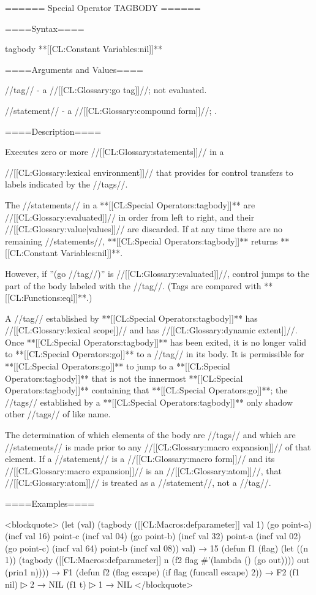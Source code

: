====== Special Operator TAGBODY ======

====Syntax====

\DefspecWithValues tagbody {} {**[[CL:Constant Variables:nil]]**}

====Arguments and Values====

//tag// - a //[[CL:Glossary:go tag]]//; not evaluated.

//statement// - a //[[CL:Glossary:compound form]]//; \evalspecial.

====Description====

Executes zero or more //[[CL:Glossary:statements]]// in a

//[[CL:Glossary:lexical environment]]// that provides for control transfers to labels indicated by the //tags//.

The //statements// in a **[[CL:Special Operators:tagbody]]** are //[[CL:Glossary:evaluated]]// in order from left to right, and their //[[CL:Glossary:value|values]]// are discarded. If at any time there are no remaining //statements//, **[[CL:Special Operators:tagbody]]** returns **[[CL:Constant Variables:nil]]**.

However, if ''(go //tag//)'' is //[[CL:Glossary:evaluated]]//, control jumps to the part of the body labeled with the //tag//. (Tags are compared with **[[CL:Functions:eql]]**.)

A //tag// established by **[[CL:Special Operators:tagbody]]** has //[[CL:Glossary:lexical scope]]// and has //[[CL:Glossary:dynamic extent]]//. Once **[[CL:Special Operators:tagbody]]** has been exited, it is no longer valid to **[[CL:Special Operators:go]]** to a //tag// in its body. It is permissible for **[[CL:Special Operators:go]]** to jump to a **[[CL:Special Operators:tagbody]]** that is not the innermost **[[CL:Special Operators:tagbody]]** containing that **[[CL:Special Operators:go]]**; the //tags// established by a **[[CL:Special Operators:tagbody]]** only shadow other //tags// of like name.

The determination of which elements of the body are //tags// and which are //statements// is made prior to any //[[CL:Glossary:macro expansion]]// of that element. If a //statement// is a //[[CL:Glossary:macro form]]// and its //[[CL:Glossary:macro expansion]]// is an //[[CL:Glossary:atom]]//, that //[[CL:Glossary:atom]]// is treated as a //statement//, not a //tag//.

====Examples====

<blockquote> (let (val) (tagbody ([[CL:Macros:defparameter]] val 1) (go point-a) (incf val 16) point-c (incf val 04) (go point-b) (incf val 32) point-a (incf val 02) (go point-c) (incf val 64) point-b (incf val 08)) val) → 15 (defun f1 (flag) (let ((n 1)) (tagbody ([[CL:Macros:defparameter]] n (f2 flag #'(lambda () (go out)))) out (prin1 n)))) → F1 (defun f2 (flag escape) (if flag (funcall escape) 2)) → F2 (f1 nil)
▷ 2 → NIL (f1 t)
▷ 1 → NIL </blockquote>

